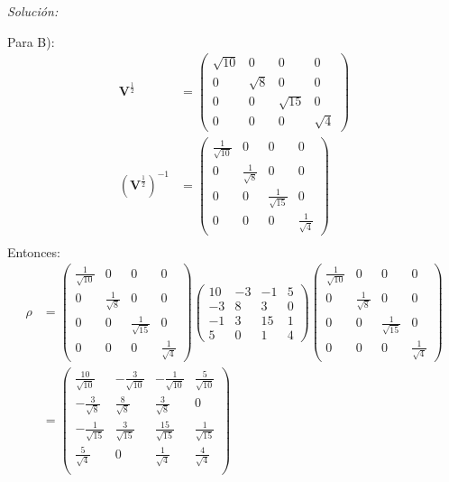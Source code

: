 \documentclass[12pt]{article}
\newenvironment{sol}
    {\emph{Solución:}
    }
    {
    }
\begin{document}
\begin{sol}
Para B):
\begin{align*}\mathbf{V}^{\frac{1}{2}} &=
\begin{pmatrix}
\sqrt{10} & 0 & 0 & 0\\
0 & \sqrt{8} & 0 & 0\\
0 & 0 & \sqrt{15} & 0\\
0 &0 &0 & \sqrt{4}
\end{pmatrix}\\ 
(\mathbf{V}^{\frac{1}{2}})^{-1} &= 
\begin{pmatrix}
\frac{1}{\sqrt{10}} & 0 & 0 & 0\\
0 &\frac{1}{\sqrt{8}}  & 0 & 0\\
0 & 0 & \frac{1}{\sqrt{15}}  & 0\\
0 &0 &0 & \frac{1}{\sqrt{4}} 
\end{pmatrix}\\ 
\end{align*}
Entonces:
\begin{align*}
\rho &= \begin{pmatrix}
\frac{1}{\sqrt{10}} & 0 & 0 & 0\\
0 &\frac{1}{\sqrt{8}}  & 0 & 0\\
0 & 0 & \frac{1}{\sqrt{15}}  & 0\\
0 &0 &0 & \frac{1}{\sqrt{4}} 
\end{pmatrix}
\begin{pmatrix}
10&-3&-1&5\\
-3&8&3&0\\
-1&3&15&1\\
5&0&1&4
\end{pmatrix}
\begin{pmatrix}
\frac{1}{\sqrt{10}} & 0 & 0 & 0\\
0 &\frac{1}{\sqrt{8}}  & 0 & 0\\
0 & 0 & \frac{1}{\sqrt{15}}  & 0\\
0 &0 &0 & \frac{1}{\sqrt{4}} 
\end{pmatrix} \\
&= 
\begin{pmatrix}
\frac{10}{\sqrt{10}} & -\frac{3}{\sqrt{10}} & -\frac{1}{\sqrt{10}} & \frac{5}{\sqrt{10}} \\
-\frac{3}{\sqrt{8}} & \frac{8}{\sqrt{8}} & \frac{3}{\sqrt{8}} & 0 \\
-\frac{1}{\sqrt{15}} & \frac{3}{\sqrt{15}} & \frac{15}{\sqrt{15}} & \frac{1}{\sqrt{15}} \\
\frac{5}{\sqrt{4}} & 0 & \frac{1}{\sqrt{4}} & \frac{4}{\sqrt{4}} \\

\end{pmatrix}
\end{align*}
\end{sol}
\end{document}
